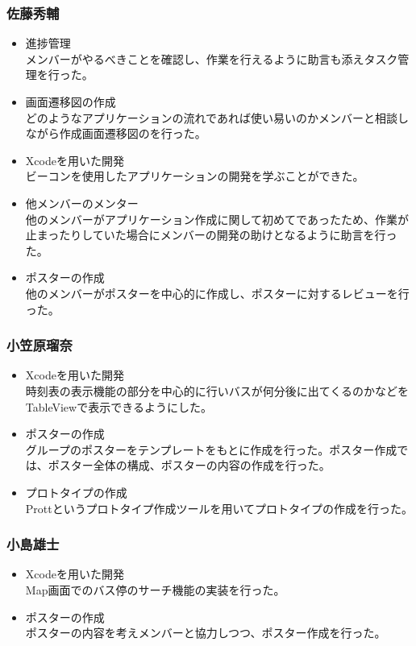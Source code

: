 \documentclass[openany,11pt,papersize]{jsbook}
\begin{document}
\subsubsection{佐藤秀輔}
\begin{itemize}
	\item 進捗管理\\
    メンバーがやるべきことを確認し、作業を行えるように助言も添えタスク管理を行った。
  \item 画面遷移図の作成\\
    どのようなアプリケーションの流れであれば使い易いのかメンバーと相談しながら作成画面遷移図のを行った。
	\item Xcodeを用いた開発\\
    ビーコンを使用したアプリケーションの開発を学ぶことができた。
  \item 他メンバーのメンター\\
    他のメンバーがアプリケーション作成に関して初めてであったため、作業が止まったりしていた場合にメンバーの開発の助けとなるように助言を行った。
  \item ポスターの作成\\
    他のメンバーがポスターを中心的に作成し、ポスターに対するレビューを行った。
\end{itemize}

\subsubsection{小笠原瑠奈}
\begin{itemize}
	\item Xcodeを用いた開発\\
    時刻表の表示機能の部分を中心的に行いバスが何分後に出てくるのかなどをTableViewで表示できるようにした。
  \item ポスターの作成\\
    グループのポスターをテンプレートをもとに作成を行った。ポスター作成では、ポスター全体の構成、ポスターの内容の作成を行った。
  \item プロトタイプの作成\\
    Prottというプロトタイプ作成ツールを用いてプロトタイプの作成を行った。
\end{itemize}

\subsubsection{小島雄士}
\begin{itemize}
	\item Xcodeを用いた開発\\
    Map画面でのバス停のサーチ機能の実装を行った。
  \item ポスターの作成\\
    ポスターの内容を考えメンバーと協力しつつ、ポスター作成を行った。
\end{itemize}
\end{document}
